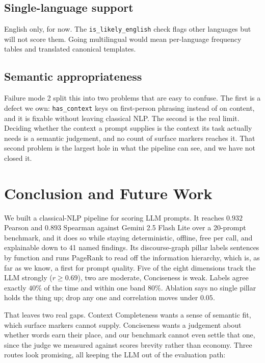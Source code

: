 \documentclass[conference]{IEEEtran}
\begin{document}
\subsection{Single-language support}
English only, for now. The \texttt{is\_likely\_english} check flags other languages but will not score them. Going multilingual would mean per-language frequency tables and translated canonical templates.

\subsection{Semantic appropriateness}
Failure mode 2 split this into two problems that are easy to confuse. The first is a defect we own: \texttt{has\_context} keys on first-person phrasing instead of on content, and it is fixable without leaving classical NLP. The second is the real limit. Deciding whether the context a prompt supplies is the context its task actually needs is a semantic judgement, and no count of surface markers reaches it. That second problem is the largest hole in what the pipeline can see, and we have not closed it.

\section{Conclusion and Future Work}

We built a classical-NLP pipeline for scoring LLM prompts. It reaches $0.932$ Pearson and $0.893$ Spearman against Gemini 2.5 Flash Lite over a 20-prompt benchmark, and it does so while staying deterministic, offline, free per call, and explainable down to 41 named findings. Its discourse-graph pillar labels sentences by function and runs PageRank to read off the information hierarchy, which is, as far as we know, a first for prompt quality. Five of the eight dimensions track the LLM strongly ($r \geq 0.69$), two are moderate, Conciseness is weak. Labels agree exactly $40\%$ of the time and within one band $80\%$. Ablation says no single pillar holds the thing up; drop any one and correlation moves under $0.05$.

That leaves two real gaps. Context Completeness wants a sense of semantic fit, which surface markers cannot supply. Conciseness wants a judgement about whether words earn their place, and our benchmark cannot even settle that one, since the judge we measured against scores brevity rather than economy. Three routes look promising, all keeping the LLM out of the evaluation path:
\end{document}
